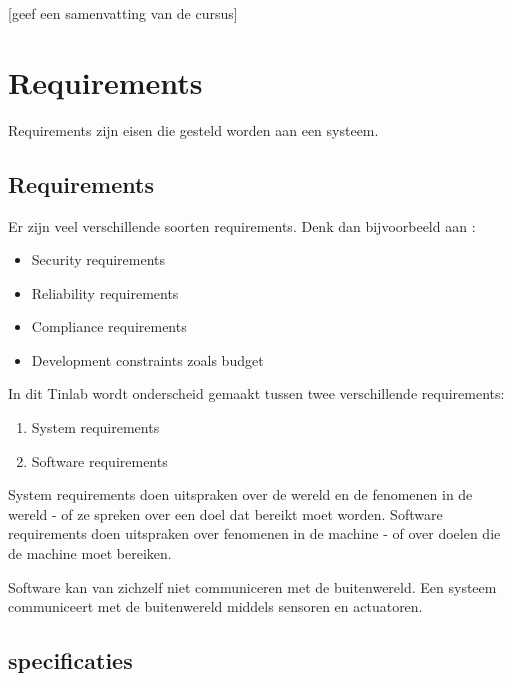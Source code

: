 \documentclass{article}
\begin{document}
	[geef een samenvatting van de cursus]
	
	\newpage
	
	
	\section{Requirements}
	
		Requirements zijn eisen die gesteld worden aan een systeem.
		
		\subsection{Requirements}
		
		Er zijn veel verschillende soorten requirements. Denk dan bijvoorbeeld aan \cite{Lamsweerde2009Requirements}\relax:

		\begin{itemize}
			\item Security requirements
			\item Reliability requirements
			\item Compliance requirements
			\item Development constraints zoals budget
		\end{itemize}

		In dit Tinlab wordt onderscheid gemaakt tussen twee verschillende requirements:

		\begin{enumerate}
			\item System requirements
			\item Software requirements
		\end{enumerate}

		System requirements doen uitspraken over de wereld en de fenomenen in de wereld - of ze spreken over een doel dat bereikt moet worden. Software requirements doen uitspraken over fenomenen in de machine - of over doelen die de machine moet bereiken.

		Software kan van zichzelf niet communiceren met de buitenwereld. Een systeem communiceert met de buitenwereld middels sensoren en actuatoren.
		
		\subsection{specificaties}
		
\end{document}
